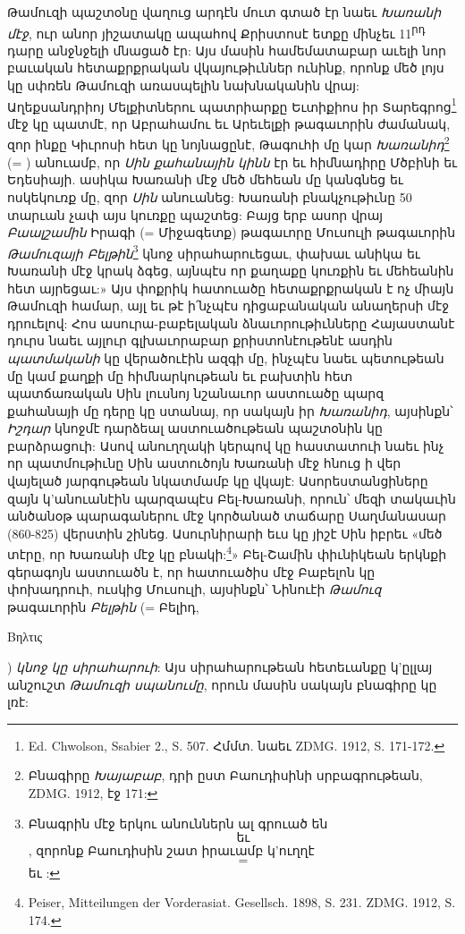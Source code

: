 \documentclass{article}
\newcommand*\svgAAAC{}
\newcommand*\svgAAAD{}
\newcommand*\svgAAAE{}
\newcommand*\svgAAAF{}
\newcommand*\svgAAAG{}
\newcommand*\svgAAAH{}
\begin{document}
{Թամուզի պաշտօնը վաղուց արդէն մուտ գտած էր նաեւ \emph{Խառանի մէջ}, ուր անոր յիշատակը ապահով Քրիստոսէ ետքը մինչեւ 11\textsuperscript{րդ} դարը անջնջելի մնացած էր: Այս մասին համեմատաբար աւելի նոր բաւական հետաքրքրական վկայութիւններ ունինք, որոնք մեծ լոյս կը սփռեն Թամուզի առասպելին նախնականին վրայ: Աղեքսանդրիոյ Մելքիտներու պատրիարքը Եւտիքիոս իր Տարեգրոց\footnote{Ed. Chwolson, Ssabier 2., S. 507. Հմմտ. նաեւ ZDMG. 1912, S. 171-172.} մէջ կը պատմէ, որ Աբրահամու եւ Արեւելքի թագաւորին ժամանակ, զոր ինքը Կիւրոսի հետ կը նոյնացընէ, Թագուհի մը կար \emph{Խառանիդ}\footnote{Բնագիրը \emph{Խայաբաբ}, դրի ըստ Բաուդիսինի սրբագրութեան, ZDMG. 1912, էջ 171:} (= $\svgAAAC$) անուամբ, որ \emph{Սին քահանային կինն} էր եւ հիմնադիրը Մծբինի եւ Եդեսիայի. ասիկա Խառանի մէջ մեծ մեհեան մը կանգնեց եւ ոսկեկուռք մը, զոր \emph{Սին} անուանեց: Խառանի բնակչութիւնը 50 տարւան չափ այս կուռքը պաշտեց: Բայց երբ ասոր վրայ \emph{Բաալշամին} Իրագի (= Միջագետք) թագաւորը Մուսուլի թագաւորին \emph{Թամուզայի Բելթին}\footnote{Բնագրին մէջ երկու անուններն ալ գրուած են $\svgAAAD$ եւ $\svgAAAE$, զորոնք Բաուդիսին շատ իրաւամբ կ'ուղղէ $\svgAAAF$ = $\svgAAAG$ եւ $\svgAAAH$:} կնոջ սիրահարուեցաւ, փախաւ անիկա եւ Խառանի մէջ կրակ ձգեց, այնպէս որ քաղաքը կուռքին եւ մեհեանին հետ այրեցաւ:» Այս փոքրիկ հատուածը հետաքրքրական է ոչ միայն Թամուզի համար, այլ եւ թէ ի՛նչպէս դիցաբանական անաղերսի մէջ դրուելով: Հոս ասուրա-բաբելական ձնաւորութիւնները Հայաստանէ դուրս նաեւ այլուր գլխաւորաբար քրիստոնէութենէ ասդին \emph{պատմականի} կը վերածուէին ազգի մը, ինչպէս նաեւ պետութեան մը կամ քաղքի մը հիմնարկութեան եւ բախտին հետ պատճառական Սին լուսնոյ նշանաւոր աստուածը պարզ քահանայի մը դերը կը ստանայ, որ սակայն իր \emph{Խառանիդ}, այսինքն՝ \emph{Իշդար} կնոջմէ դարձեալ աստուածութեան պաշտօնին կը բարձրացուի: Ասով անուղղակի կերպով կը հաստատուի նաեւ ինչ որ պատմութիւնը Սին աստուծոյն Խառանի մէջ հնուց ի վեր վայելած յարգութեան նկատմամբ կը վկայէ: Ասորեստանցիները զայն կ'անուանէին պարզապէս Բել-Խառանի, որուն՝ մեզի տակաւին անծանօթ պարագաներու մէջ կործանած տաճարը Սաղմանասար (860-825) վերստին շինեց. Ասուրնիրարի եւս կը յիշէ Սին իբրեւ «մեծ տէրը, որ Խառանի մէջ կը բնակի:\footnote{Peiser, Mitteilungen der Vorderasiat. Gesellsch. 1898, S. 231. ZDMG. 1912, S. 174.}» Բել-Շամին փիւնիկեան երկնքի գերագոյն աստուածն է, որ հատուածիս մէջ Բաբելոն կը փոխադրուի, ուսկից Մուսուլի, այսինքն՝ Նինուէի \emph{Թամուզ} թագաւորին \emph{Բելթին} (= Բելիդ, \begin{greek}Βηλτις\end{greek}) \emph{կնոջ կը սիրահարուի}: Այս սիրահարութեան հետեւանքը կ'ըլլայ անշուշտ \emph{Թամուզի սպանումը}, որուն մասին սակայն բնագիրը կը լռէ:

}
\end{document}
